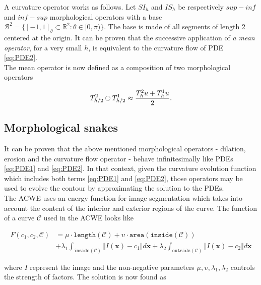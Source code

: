A curvature operator works as follows. Let $SI_h$ and $IS_h$ be respectively $sup-inf$ and $inf-sup$ morphological operators with a base $\mathcal{B}^2 = \{ [-1,1]_{\theta} \subset \mathbb{R}^2 : \theta \in [0, \pi) \}$. The base is made of all segments of length 2 centered at the origin. It can be proven that the successive application of \textit{a mean operator}, for a very small $h$, is equivalent to the curvature flow of PDE \ref{eq:PDE2}. \\

The mean operator is now defined as a composition of two morphological operators

\begin{equation}
	T_{h/2}^2 \ocircle T_{h/2}^1 \approx \frac{T_h^2u + T_h^1u}{2}.
\end{equation}

\subsection{Morphological snakes}

It can be proven that the above mentioned morphological operators - dilation, erosion and the curvature flow operator - behave infinitesimally like PDEs \ref{eq:PDE1} and \ref{eq:PDE2}. In that context, given the curvature evolution function which includes both terms \ref{eq:PDE1} and \ref{eq:PDE2}, those operators may be used to evolve the contour by approximating the solution to the PDEs. \\

The ACWE uses an energy function for image segmentation which takes into account the content of the interior and exterior regions of the curve. The function of a curve $\mathcal{C}$ used in the ACWE looks like

\begin{equation}
	\begin{split}
		F(c_1,c_2, \mathcal{C}) & = \mu \cdot \mathtt{length}(\mathcal{C}) + \upsilon \cdot \mathtt{area}(\mathtt{inside}(\mathcal{C})) \\
	 & + \lambda_1 \int_{\mathtt{inside}(\mathcal{C})} \Vert I(\mathbf{x}) - c_1 \Vert d\mathbf{x} +   \lambda_2 \int_{\mathtt{outside}(\mathcal{C})} \Vert I(\mathbf{x}) - c_2 \Vert d\mathbf{x}
	\end{split}
	\label{eq:Functional}
\end{equation}

where $I$ represent the image and the non-negative parameters $\mu, \upsilon, \lambda_1, \lambda_2$ controls the strength of factors. The solution is now found as 

